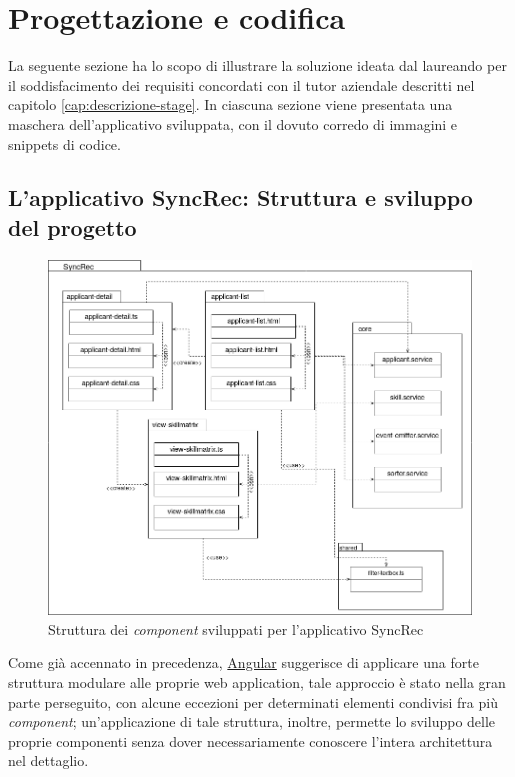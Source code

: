 
\chapter{Progettazione e codifica}
\label{cap:progettazione-codifica}

La seguente sezione ha lo scopo di illustrare la soluzione ideata dal laureando per il soddisfacimento dei requisiti concordati con il tutor aziendale descritti nel capitolo \ref{cap:descrizione-stage}. In ciascuna sezione viene presentata una maschera dell'applicativo sviluppata, con il dovuto corredo di immagini e \gls{snippets} di codice.


\section{L'applicativo SyncRec: Struttura e sviluppo del progetto}

\begin{figure}[!h] 
	\centering 
	\includegraphics[width=1\columnwidth]{immagini/usecase/UML1} 
	\caption{Struttura dei \textit{component} sviluppati per l'applicativo SyncRec}
	\label{figura:UML1}
\end{figure}

Come già accennato in precedenza, \hyperref[angular]{Angular} suggerisce di applicare una forte struttura modulare alle proprie \gls{web application}, tale approccio è stato nella gran parte perseguito, con alcune eccezioni per determinati elementi condivisi fra più \textit{component}; un'applicazione di tale struttura, inoltre, permette lo sviluppo delle proprie componenti senza dover necessariamente conoscere l'intera architettura nel dettaglio.

